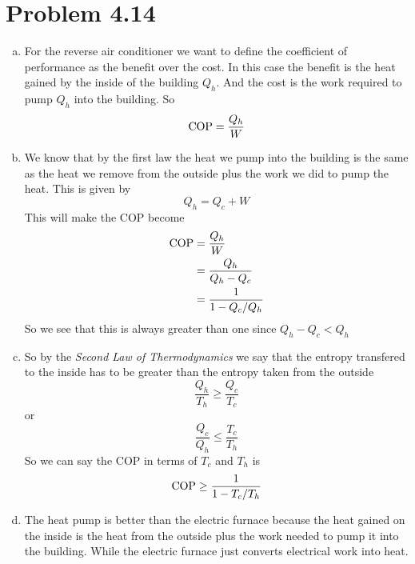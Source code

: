 \documentclass[11pt]{article}
\numberwithin{equation}{section}
\begin{document}
\section{Problem 4.14}
\begin{enumerate}[(a)]
\item
For the reverse air conditioner we want to define the coefficient of performance as the benefit over the cost. In this case the benefit is the heat gained by the inside of the building $Q_h$. And the cost is the work required to pump $Q_h$ into the building. So
$$\textnormal{COP} = \frac{Q_h}{W}$$

\item
We know that by the first law the heat we pump into the building is the same as the heat we remove from the outside plus the work we did to pump the heat. This is given by
$$Q_h = Q_c + W$$
This will make the COP become
\begin{align*}
\textnormal{COP} &= \frac{Q_h}{W}\\
&= \frac{Q_h}{Q_h-Q_c}\\
&= \frac{1}{1-Q_c/Q_h}
\end{align*}
So we see that this is always greater than one since $Q_h-Q_c<Q_h$

\item
So by the \emph{Second Law of Thermodynamics} we say that the entropy transfered to the inside has to be greater than the entropy taken from the outside
$$\frac{Q_h}{T_h} \ge \frac{Q_c}{T_c}$$
or
$$\frac{Q_c}{Q_h} \le \frac{T_c}{T_h}$$
So we can say the COP in terms of $T_c$ and $T_h$ is
$$\textnormal{COP} \ge \frac{1}{1-T_c/T_h}$$

\item
The heat pump is better than the electric furnace because the heat gained on the inside is the heat from the outside plus the work needed to pump it into the building. While the electric furnace just converts electrical work into heat.
\end{enumerate}
\end{document}
